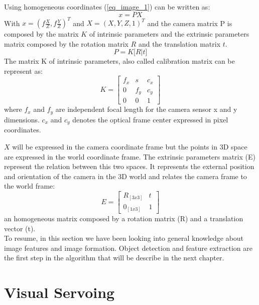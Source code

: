 Using homogeneous coordinates (\ref{eq_image_1}) can be written as:
\begin{equation}
   x = PX
\end{equation}
With $ x = (f \frac{X}{Z},f \frac{Y}{Z})^T $ and $ X = (X, Y, Z, 1)^T$ and the camera matrix P is composed by the matrix $K$ of intrinsic parameters and the extrinsic parameters matrix composed by the rotation matrix $R$ and the translation matrix $t$.
\begin{equation}
   P = K \big[ R|t \big]
\end{equation}
The matrix K of intrinsic parameters, also called calibration matrix can be represent as:
\[
K 
=
\begin{bmatrix}
    f_{x} & s & c_{x} \\
    0 & f_{y} & c_{y}\\
    0 & 0 & 1
\end{bmatrix}
\]
where $f_{x}$ and $f_{y}$ are independent focal length for the camera sensor x and y dimensions. $c_{x}$ and $c_{y}$ denotes the optical frame center expressed in pixel coordinates.

$X$ will be expressed in the camera coordinate frame but the points in 3D space are expressed in the world coordinate frame. The extrinsic parameters matrix (E)  represent the relation between this two spaces. It represents the external position and orientation of the camera in the 3D world and relates the camera frame to the world frame:
\[
E
=
\begin{bmatrix}
    R_{[3x3]} & t \\
    0_{[1x3]} & 1
\end{bmatrix}
\]
an homogeneous matrix composed by a rotation matrix (R) and a translation vector (t).\\

To resume, in this section we have been looking into general knowledge about image features and image formation. Object detection and feature extraction are the first step in the algorithm that will be describe in the next chapter.

\section{Visual Servoing}
\label{Visual_Servoing}

